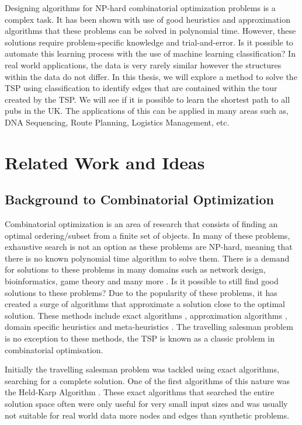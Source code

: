 \documentclass[]{UCD_CS_FYP_Report}
\begin{document}
Designing algorithms for NP-hard combinatorial optimization problems is a complex task. It has been shown with use of good heuristics and approximation algorithms that these problems can be solved in polynomial time. However, these solutions require problem-specific knowledge and trial-and-error. Is it possible to automate this learning process with the use of machine learning classification? In real world applications, the data is very rarely similar however the structures within the data do not differ. In this thesis, we will explore a method to solve the TSP using classification to identify edges that are contained within the tour created by the TSP. We will see if it is possible to learn the shortest path to all pubs in the UK. The applications of this can be applied in many areas such as, DNA Sequencing, Route Planning, Logistics Management, etc.

\chapter{Related Work and Ideas}
\section{Background to Combinatorial Optimization}
Combinatorial optimization is an area of research that consists of finding an optimal ordering/subset from a finite set of objects. In many of these problems, exhaustive search is not an option as these problems are NP-hard, meaning that there is no known polynomial time algorithm to solve them. There is a demand for solutions to these problems in many domains such as network design, bioinformatics, game theory and many more \cite{combApplications}. Is it possible to still find good solutions to these problems? Due to the popularity of these problems, it has created a surge of algorithms that approximate a solution close to the optimal solution. These methods include exact algorithms \cite{Bellman:1962:DPT:321105.321111}, approximation algorithms \cite{JohnMcGe97}, domain specific heuristics\cite{davidapplegate2007} and meta-heuristics \cite{Larranaga1999, NatureBasedHeuristics}. The travelling salesman problem is no exception to these methods, the TSP is known as a classic problem in combinatorial optimisation. 

Initially the travelling salesman problem was tackled using exact algorithms, searching for a complete solution. One of the first algorithms of this nature was the Held-Karp Algorithm \cite{Bellman:1962:DPT:321105.321111}. These exact algorithms that searched the entire solution space often were only useful for very small input sizes and was usually not suitable for real world data more nodes and edges than synthetic problems.
\end{document}
